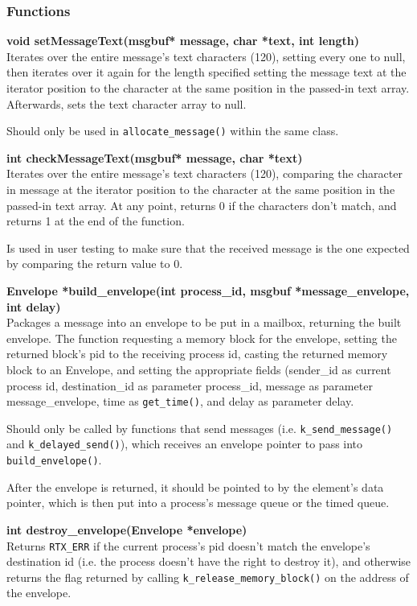 \documentclass[11pt, oneside]{article}
\begin{document}
\subsubsection{Functions}
{\bf void setMessageText(msgbuf* message, char *text, int length)}\\
Iterates over the entire message's text characters (120), setting every one to null, then iterates over it again for the length specified setting the message text at the iterator position to the character at the same position in the passed-in text array. Afterwards, sets the text character array to null.

Should only be used in {\tt allocate\_message()} within the same class.

{\bf int checkMessageText(msgbuf* message, char *text)}\\
Iterates over the entire message's text characters (120), comparing the character in message at the iterator position to the character at the same position in the passed-in text array. At any point, returns 0 if the characters don't match, and returns 1 at the end of the function.

Is used in user testing to make sure that the received message is the one expected by comparing the return value to 0.

{\bf Envelope *build\_envelope(int process\_id, msgbuf *message\_envelope, int delay)}\\
Packages a message into an envelope to be put in a mailbox, returning the built envelope. The function requesting a memory block for the envelope, setting the returned block's pid to the receiving process id, casting the returned memory block to an Envelope, and setting the appropriate fields (sender\_id as current process id, destination\_id as parameter process\_id, message as parameter message\_envelope, time as {\tt get\_time()}, and delay as parameter delay.

Should only be called by functions that send messages (i.e. {\tt k\_send\_message()} and {\tt k\_delayed\_send()}), which receives an envelope pointer to pass into {\tt build\_envelope()}.

After the envelope is returned, it should be pointed to by the element's data pointer, which is then put into a process's message queue or the timed queue.

{\bf int destroy\_envelope(Envelope *envelope)}\\
Returns {\tt RTX\_ERR} if the current process's pid doesn't match the envelope's destination id (i.e. the process doesn't have the right to destroy it), and otherwise returns the flag returned by calling {\tt k\_release\_memory\_block()} on the address of the envelope.
\end{document}
